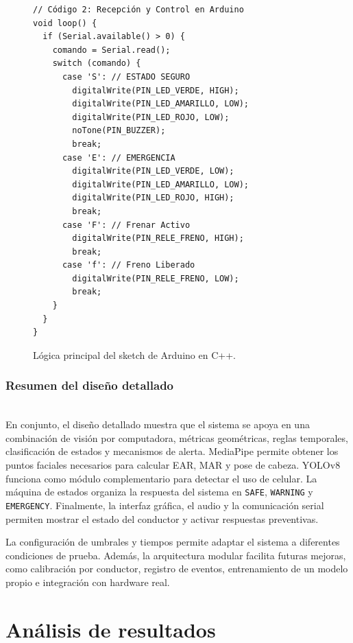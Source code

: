 \documentclass[conference]{IEEEtran}
\begin{document}
\begin{figure}[H]
\centering
\begin{minipage}{\columnwidth}
\scriptsize
\begin{verbatim}
// Código 2: Recepción y Control en Arduino
void loop() {
  if (Serial.available() > 0) {
    comando = Serial.read();
    switch (comando) {
      case 'S': // ESTADO SEGURO
        digitalWrite(PIN_LED_VERDE, HIGH);
        digitalWrite(PIN_LED_AMARILLO, LOW);
        digitalWrite(PIN_LED_ROJO, LOW);
        noTone(PIN_BUZZER);
        break;
      case 'E': // EMERGENCIA
        digitalWrite(PIN_LED_VERDE, LOW);
        digitalWrite(PIN_LED_AMARILLO, LOW);
        digitalWrite(PIN_LED_ROJO, HIGH);
        break;
      case 'F': // Frenar Activo
        digitalWrite(PIN_RELE_FRENO, HIGH);
        break;
      case 'f': // Freno Liberado
        digitalWrite(PIN_RELE_FRENO, LOW);
        break;
    }
  }
}
\end{verbatim}
\end{minipage}
\caption{Lógica principal del sketch de Arduino en C++.}
\label{code:arduino_serial}
\end{figure}

\subsubsection{Resumen del diseño detallado}\mbox{}\\

En conjunto, el diseño detallado muestra que el sistema se apoya en una combinación de visión por computadora, métricas geométricas, reglas temporales, clasificación de estados y mecanismos de alerta. MediaPipe permite obtener los puntos faciales necesarios para calcular EAR, MAR y pose de cabeza. YOLOv8 funciona como módulo complementario para detectar el uso de celular. La máquina de estados organiza la respuesta del sistema en \texttt{SAFE}, \texttt{WARNING} y \texttt{EMERGENCY}. Finalmente, la interfaz gráfica, el audio y la comunicación serial permiten mostrar el estado del conductor y activar respuestas preventivas.

La configuración de umbrales y tiempos permite adaptar el sistema a diferentes condiciones de prueba. Además, la arquitectura modular facilita futuras mejoras, como calibración por conductor, registro de eventos, entrenamiento de un modelo propio e integración con hardware real.




\section{Análisis de resultados}
\end{document}
